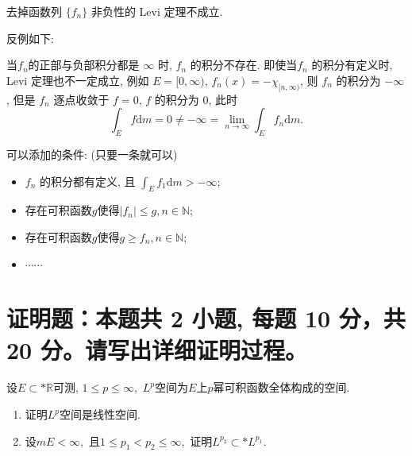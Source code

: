 \begin{solution}
  去掉函数列 \(\{f_n\}\) 非负性的 Levi 定理不成立. 

  反例如下: 

  当\(f_n\)的正部与负部积分都是 \(\infty\) 时, \(f_n\) 的积分不存在. 即使当\(f_n\) 的积分有定义时, Levi 定理也不一定成立, 例如 \(E = [0, \infty)\), \(f_n(x) = - \chi_{[n, \infty)}\), 则 \(f_n\) 的积分为 \(- \infty\), 但是 \(f_n\) 逐点收敛于 \(f = 0\), \(f\) 的积分为 \(0\), 此时
  \[\int_E f \mathrm{d} m = 0 \neq - \infty = \lim_{n \to \infty} \int_E f_n \mathrm{d} m.\]

  可以添加的条件: (只要一条就可以) 
  \begin{itemize}
    \item \(f_n\) 的积分都有定义, 且
    \(\displaystyle \int_E f_1 \mathrm{d} m > - \infty\);
    \item 存在可积函数\(g\)使得\(\lvert f_n \rvert \leqslant g, n \in \mathbb{N}\);
    \item 存在可积函数\(g\)使得\(g \geqslant f_n, n \in \mathbb{N}\);
    \item \(\cdots\cdots\)
  \end{itemize}
\end{solution}


\section{证明题：本题共 2 小题, 每题 10 分，共 20 分。请写出详细证明过程。}


\begin{question}[points = 10]
  设$E \subset* \mathbb{R}$可测, $1 \leqslant p \leqslant \infty,$ $L^p$空间为$E$上$p$幂可积函数全体构成的空间.
  \begin{enumerate}
    \item 证明$L^p$空间是线性空间.
    \item 设$m E < \infty,$ 且$1 \leqslant p_1 < p_2 \leqslant \infty,$ 证明$L^{p_2} \subset* L^{p_1}.$
  \end{enumerate}

\end{question}

